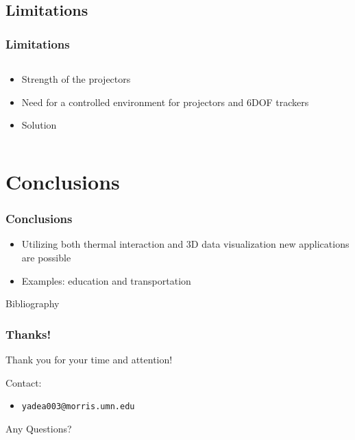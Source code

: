 \documentclass{beamer}
\newcommand{\linespace}{\vskip 0.25cm}
\begin{document}
\subsection{Limitations}
\begin{frame}	
\frametitle{Limitations}
    \begin{columns}
    \begin{column}{.8\textwidth}
	\begin{itemize}
		\item Strength of the projectors 
		\item Need for a controlled environment for projectors and 6DOF trackers
		\item Solution
	\end{itemize}
	\end{column}
	\end{columns}
\end{frame}

\section[Conclusions]{Conclusions}
\begin{frame}
\frametitle{Conclusions}
	\begin{itemize}
		\item Utilizing both thermal interaction and 3D data visualization new applications are possible
		\item Examples: education and transportation

	\end{itemize}
\end{frame}

\begin{frame}[allowframebreaks]{Bibliography} 


\end{frame}

\begin{frame}
	\frametitle{Thanks!}
	
	Thank you for your time and attention!
		
	\linespace
	\linespace
	
	Contact:  
	\begin{itemize}
		\item \texttt{yadea003@morris.umn.edu}
	\end{itemize}
	
	\linespace
	\linespace
	
	\begin{center}
	{\huge Any Questions?}
	\end{center}
\end{frame}
\end{document}
